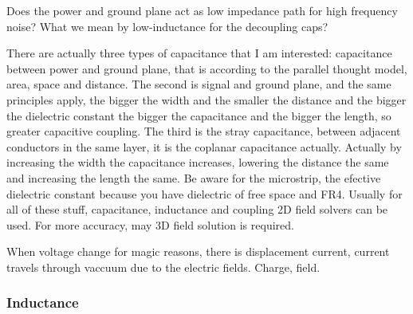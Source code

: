 \documentclass[12pt]{article}
\begin{document}
Does the power and ground plane act as low impedance path for high frequency noise?
What we mean by low-inductance for the decoupling caps?

There are actually three types of capacitance that I am interested: capacitance between power and ground plane, that is according to the parallel thought model, area, space and distance. The second is signal and ground plane, and the same principles apply, the bigger the width and the smaller the distance and the bigger the dielectric constant the bigger the capacitance and the bigger the length, so greater capacitive coupling. The third is the stray capacitance, between adjacent conductors in the same layer, it is the coplanar capacitance actually. Actually by increasing the width the capacitance increases, lowering the distance the same and increasing the length the same. Be aware for the microstrip, the efective dielectric constant because you have dielectric of free space and FR4. Usually for all of these stuff, capacitance, inductance and coupling 2D field solvers can be used. For more accuracy, may 3D field solution is required.

When voltage change for magic reasons, there is displacement current, current travels through vaccuum due to the electric fields. Charge, field.

\subsubsection{Inductance}


\end{document}
